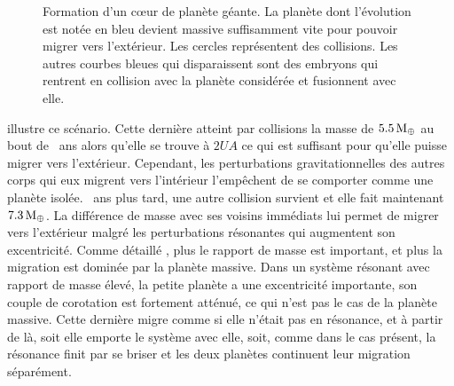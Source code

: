 \begin{figure}[htbp]
\centering
{}\hfill
{}
\caption[Formation d'un cœur de planète géante.]{Formation d'un cœur de planète géante. La planète dont l'évolution est notée en
bleu devient massive suffisamment vite pour pouvoir migrer vers l'extérieur. Les cercles représentent des collisions. Les autres
courbes bleues qui disparaissent sont des embryons qui rentrent en collision avec la planète considérée et fusionnent avec elle.
}%
\end{figure}

 illustre ce scénario. Cette dernière atteint par collisions la masse de $5.5\mathrm{\thinspace M_\oplus}$ au bout de ~ans alors qu'elle se trouve à $2\unit{UA}$ ce qui est suffisant pour qu'elle puisse migrer vers l'extérieur. Cependant, les perturbations gravitationnelles des autres corps qui eux migrent vers l'intérieur l'empêchent de se comporter comme une planète isolée. ~ans plus tard, une autre collision survient et elle fait maintenant $7.3\mathrm{\thinspace M_\oplus}$. La différence de masse avec ses voisins immédiats lui permet de migrer vers l'extérieur malgré les perturbations résonantes qui augmentent son excentricité. Comme détaillé , plus le rapport de masse est important, et plus la migration est dominée par la planète massive. Dans un système résonant avec rapport de masse élevé, la petite planète a une excentricité importante, son couple de corotation est fortement atténué, ce qui n'est pas le cas de la planète 
massive. Cette dernière migre comme si elle n'était pas en résonance, et à partir de là, soit elle emporte le système avec elle, soit, comme dans le cas présent, la résonance finit par se briser et les deux planètes continuent leur migration séparément.

